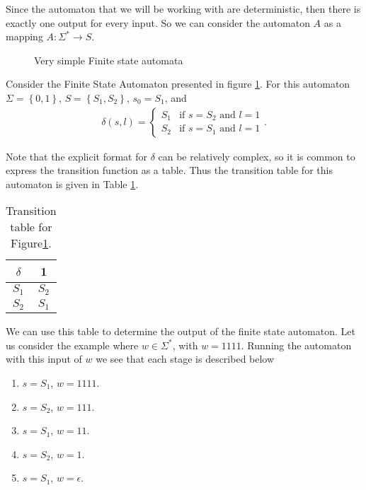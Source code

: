 \documentclass[10pt]{amsart}
\theoremstyle{definition}
\theoremstyle{remark}
\begin{document}
Since the automaton that we will be working with are deterministic, then there
is exactly one output for every input. So we can consider the automaton $A$ as
a mapping $A:\Sigma^*\rightarrow S$.

\begin{figure}[htpb]
  \begin{center}
  \end{center}
  \caption{Very simple Finite state automata}%
  \label{fig:auto_ex}
\end{figure}

Consider the Finite State Automaton presented in figure \ref{fig:auto_ex}. For
this automaton $\Sigma=\left\{0, 1\right\}$, $S=\left\{S_1,S_2\right\}$,
$s_0=S_1$, and
\begin{align*}
  \delta(s, l) = \begin{cases}
    S_1 & \text{if }s=S_2\text{ and }l=1\\
    S_2 & \text{if }s=S_1\text{ and }l=1
  \end{cases}.
\end{align*}

Note that the explicit format for $\delta$ can be relatively complex, so it is
common to express the transition function as a table. Thus the transition table
for this automaton is given in Table \ref{tab:auto_ex}.

\begin{table}[htpb]
  \centering
  \caption{Transition table for Figure\ref{fig:auto_ex}.}\label{tab:auto_ex}
  \begin{tabular}{c||c}
    $\delta$ & 1\\
    \hline\hline
    $S_1$ & $S_2$\\
    \hline
    $S_2$ & $S_1$\\
  \end{tabular}
\end{table}

We can use this table to determine the output of the finite state automaton.
Let us consider the example where $w\in\Sigma^*$, with $w=1111$. Running the
automaton with this input of $w$ we see that each stage is described below
\begin{multicols}{2}
  \begin{enumerate}
    \item $s=S_1$, $w=1111$.
    \item $s=S_2$, $w=111$.
    \item $s=S_1$, $w=11$.
    \item $s=S_2$, $w=1$.
    \item $s=S_1$, $w=\epsilon$.
  \end{enumerate}
\end{multicols}
\end{document}
